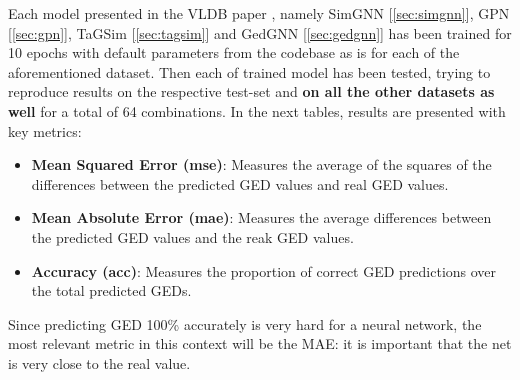 \documentclass[../Thesis.tex]{subfiles}
\begin{document}
	Each model presented in the VLDB paper \cite{computing_graph_edit_distance_via_neural_graph_matching}, namely SimGNN [\autoref{sec:simgnn}], GPN [\autoref{sec:gpn}], TaGSim [\autoref{sec:tagsim}] and GedGNN [\autoref{sec:gedgnn}] has been trained for 10 epochs with default parameters from the codebase as is for each of the aforementioned dataset. Then each of trained model has been tested, trying to reproduce \cite{computing_graph_edit_distance_via_neural_graph_matching} results on the respective test-set and \textbf{on all the other datasets as well} for a total of 64 combinations. In the next tables, results are presented with key metrics: 
	\begin{itemize}
		\item \textbf{Mean Squared Error (mse)}: Measures the average of the squares of the differences between the predicted GED values and real GED values.
		\item \textbf{Mean Absolute Error (mae)}: Measures the average differences between the predicted GED values and the reak GED values.
		\item \textbf{Accuracy (acc)}: Measures the proportion of correct GED predictions over the total predicted GEDs.
	\end{itemize}
	
	Since predicting GED 100\% accurately is very hard for a neural network, the most relevant metric in this context will be the MAE: it is important that the net is very close to the real value.
	
\end{document}
